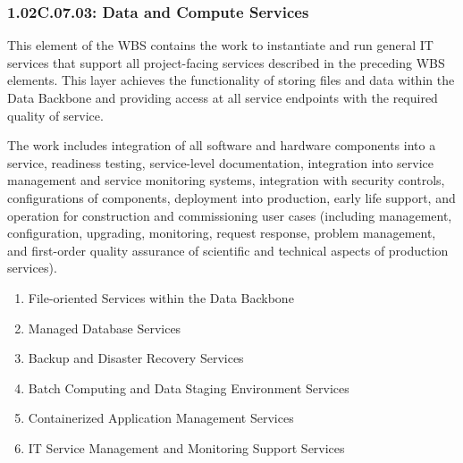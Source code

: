 \subsubsection{1.02C.07.03: Data and Compute Services}

This element of the WBS contains the work to instantiate and run general IT services that support all project-facing services described in the preceding WBS elements.
This layer achieves the functionality of storing files and data within the Data Backbone and providing access at all service endpoints with the required quality of service.

The work includes integration of all software and hardware components into a service, readiness testing, service-level documentation, integration into service management and service monitoring systems, integration with security controls, configurations of components, deployment into production, early life support, and operation for construction and commissioning user cases (including management, configuration, upgrading, monitoring, request response, problem management, and first-order quality assurance of scientific and technical aspects of production services).

\begin{enumerate}

  \item{File-oriented Services within the Data Backbone}
  \item{Managed Database Services}
  \item{Backup and Disaster Recovery Services}
  \item{Batch Computing and Data Staging Environment Services}
  \item{Containerized Application Management Services}
  \item{IT Service Management and Monitoring Support Services}

\end{enumerate}

